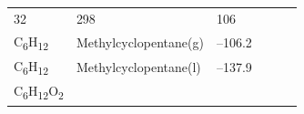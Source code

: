 \documentclass[
]{book}
\theoremstyle{definition}
\theoremstyle{definition}
\theoremstyle{definition}
\theoremstyle{remark}
\begin{document}
\begin{longtable}[]{@{}llllll@{}}
\begin{minipage}[t]{0.15\columnwidth}
32\strut
\end{minipage} & \begin{minipage}[t]{0.14\columnwidth}\raggedright
298\strut
\end{minipage} & \begin{minipage}[t]{0.14\columnwidth}\raggedright
106\strut
\end{minipage}\tabularnewline
\begin{minipage}[t]{0.07\columnwidth}\raggedright
C\textsubscript{6}H\textsubscript{12}\strut
\end{minipage} & \begin{minipage}[t]{0.17\columnwidth}\raggedright
Methylcyclopentane(g)\strut
\end{minipage} & \begin{minipage}[t]{0.15\columnwidth}\raggedright
--106.2\strut
\end{minipage} & \begin{minipage}[t]{0.15\columnwidth}\raggedright
\strut
\end{minipage} & \begin{minipage}[t]{0.14\columnwidth}\raggedright
\strut
\end{minipage} & \begin{minipage}[t]{0.14\columnwidth}\raggedright
\strut
\end{minipage}\tabularnewline
\begin{minipage}[t]{0.07\columnwidth}\raggedright
C\textsubscript{6}H\textsubscript{12}\strut
\end{minipage} & \begin{minipage}[t]{0.17\columnwidth}\raggedright
Methylcyclopentane(l)\strut
\end{minipage} & \begin{minipage}[t]{0.15\columnwidth}\raggedright
--137.9\strut
\end{minipage} & \begin{minipage}[t]{0.15\columnwidth}\raggedright
\strut
\end{minipage} & \begin{minipage}[t]{0.14\columnwidth}\raggedright
\strut
\end{minipage} & \begin{minipage}[t]{0.14\columnwidth}\raggedright
\strut
\end{minipage}\tabularnewline
\begin{minipage}[t]{0.07\columnwidth}\raggedright
C\textsubscript{6}H\textsubscript{12}O\textsubscript{2}\strut
\end{minipage} & \begin{minipage}[t]{0.17\columnwidth}\raggedright

\end{minipage}
\end{longtable}
\end{document}

